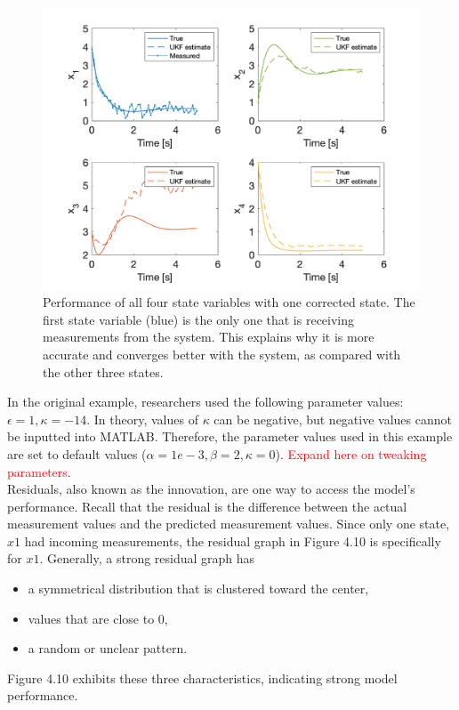 \begin{figure}[h]
    \centering
    \includegraphics[scale = 0.6]{Meskin_states.png}
    \caption{Performance of all four state variables with one corrected state. The first state variable (blue) is the only one that is receiving measurements from the system. This explains why it is more accurate and converges better with the system, as compared with the other three states.}
    \label{map}
\end{figure}

\noindent In the original example, researchers used the following parameter values: $\epsilon = 1, \kappa = -14$. In theory, values of $\kappa$ can be negative, but negative values cannot be inputted into MATLAB. Therefore, the parameter values used in this example are set to default values ($\alpha = 1e-3, \beta = 2, \kappa = 0$). \textcolor{red}{Expand here on tweaking parameters}.\\

\noindent Residuals, also known as the innovation, are one way to access the model's performance. Recall that the residual is the difference between the actual measurement values and the predicted measurement values. Since only one state, $x1$ had incoming measurements, the residual graph in Figure 4.10 is specifically for $x1$. Generally, a strong residual graph has
\begin{itemize}
\item a symmetrical distribution that is clustered toward the center,
\item values that are close to 0,
\item a random or unclear pattern.
\end{itemize}
Figure 4.10 exhibits these three characteristics, indicating strong model performance. 

